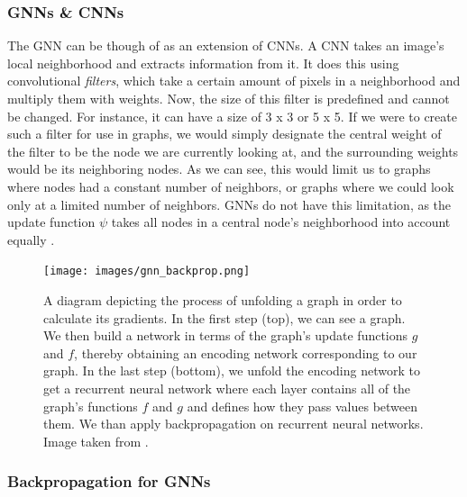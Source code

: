 \documentclass[times, utf8, diplomski, english]{fer_eng}
\begin{document}
\subsubsection{GNNs \& CNNs}

The GNN can be though of as an extension of CNNs. A CNN takes an image's local neighborhood and extracts information from it. It does this using convolutional \textit{filters}, which take a certain amount of pixels in a neighborhood and multiply them with weights. Now, the size of this filter is predefined and cannot be changed. For instance, it can have a size of 3 x 3 or 5 x 5. If we were to create such a filter for use in graphs, we would simply designate the central weight of the filter to be the node we are currently looking at, and the surrounding weights would be its neighboring nodes. As we can see, this would limit us to graphs where nodes had a constant number of neighbors, or graphs where we could look only at a limited number of neighbors. GNNs do not have this limitation, as the update function $\psi$ takes all nodes in a central node's neighborhood into account equally \cite{GRL} \cite{bronstein2021geometric}.

\begin{figure}
	\centering
	\texttt{[image: images/gnn\_backprop.png]}
	\caption[GNN backpropagation]{A diagram depicting the process of unfolding a graph in order to calculate its gradients. In the first step (top), we can see a graph. We then build a network in terms of the graph's update functions $g$ and $f$, thereby obtaining an encoding network corresponding to our graph. In the last step (bottom), we unfold the encoding network to get a recurrent neural network where each layer contains all of the graph's functions $f$ and $g$ and defines how they pass values between them. We than apply backpropagation on recurrent neural networks. Image taken from \cite{GNN}.}
	\label{fig:gnn backprop}
\end{figure}

\subsubsection{Backpropagation for GNNs}
\end{document}
